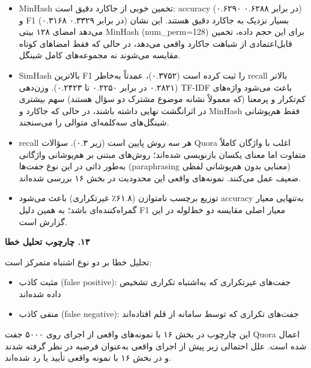 \documentclass[11pt]{article}
\begin{document}
\begin{itemize}

\item ‏MinHash تخمین خوبی از جاکارد دقیق است: accuracy (۰.۶۲۹۰ در برابر ۰.۶۲۸۸) و F1 (۰.۳۱۶۸ در برابر ۰.۳۳۲۹) بسیار نزدیک به جاکارد دقیق هستند. این نشان می‌دهد امضای ۱۲۸ بیتی MinHash (num\_perm=128) برای این حجم داده، تخمین قابل‌اعتمادی از شباهت جاکارد واقعی می‌دهد، در حالی که فقط امضاهای کوتاه مقایسه می‌شوند نه مجموعه‌های کامل شینگل.

\item ‏SimHash بالاترین F1 را ثبت کرده است (۰.۳۷۵۲)، عمدتاً به‌خاطر recall بالاتر (۰.۲۸۲۱ در برابر ۰.۲۲۵۰ تا ۰.۲۴۲۳). وزن‌دهی TF-IDF باعث می‌شود واژه‌های کم‌تکرار و پرمعنا (که معمولاً نشانه موضوع مشترک دو سؤال هستند) سهم بیشتری در اثرانگشت نهایی داشته باشند، در حالی که جاکارد و MinHash فقط هم‌پوشانی شینگل‌های سه‌کلمه‌ای متوالی را می‌سنجند.

\item ‏recall هر سه روش پایین است (زیر ۰.۳). سؤالات Quora اغلب با واژگان کاملاً متفاوت اما معنای یکسان بازنویسی شده‌اند؛ روش‌های مبتنی بر هم‌پوشانی واژگانی به‌طور ذاتی در این نوع جفت‌ها (paraphrasing معنایی بدون هم‌پوشانی لفظی) ضعیف عمل می‌کنند. نمونه‌های واقعی این محدودیت در بخش ۱۶ بررسی شده‌اند.

\item ‏توزیع برچسب نامتوازن (۶۱.۸٪ غیرتکراری) باعث می‌شود accuracy به‌تنهایی معیار گمراه‌کننده‌ای باشد؛ به همین دلیل F1 معیار اصلی مقایسه دو خط‌لوله در این گزارش است.

\end{itemize}

\medskip\noindent\hrulefill\medskip

\medskip
{\large\bfseries ‏۱۳. چارچوب تحلیل خطا}\medskip


\noindent ‏تحلیل خطا بر دو نوع اشتباه متمرکز است:\par

\begin{itemize}

\item ‏مثبت کاذب (false positive): جفت‌های غیرتکراری که به‌اشتباه تکراری تشخیص داده شده‌اند

\item ‏منفی کاذب (false negative): جفت‌های تکراری که توسط سامانه از قلم افتاده‌اند

\end{itemize}

\noindent ‏این چارچوب در بخش ۱۶ با نمونه‌های واقعی از اجرای روی ۵۰۰۰ جفت Quora اعمال شده است. علل احتمالی زیر پیش از اجرای واقعی به‌عنوان فرضیه در نظر گرفته شدند و در بخش ۱۶ با نمونه واقعی تأیید یا رد شده‌اند.\par
\end{document}
